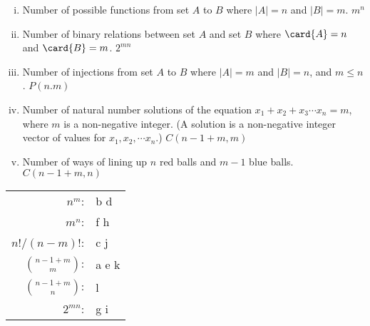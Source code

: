 \documentclass[quiz]{mcs}
\begin{document}
\begin{problem}
\begin{enumerate}[(i)]
\item Number of possible functions from set $A$ to $B$ where $|A|=n$ and
$|B|=m$. $m^n$

\item Number of binary relations between set $A$ and set $B$ where $\card{A}=n$ and
$\card{B}=m$. $2^{mn}$

\item Number of injections from set $A$ to $B$ where $|A|=m$ and $|B|=n$,
and $m \leq n$. $P(n.m)$

\item Number of natural number solutions of the equation $x_1 + x_2 + x_3
\cdots x_n = m$, where $m$ is a non-negative integer.  (A solution is
a non-negative integer vector of values for $x_1,x_2,\cdots x_n$.)
$C(n-1+m,m)$

\item Number of ways of lining up $n$ red balls and $m-1$ blue balls. $C(n-1+m,n)$

\end{enumerate}

\begin{solution}
\begin{center}
\begin{tabular}{rl}
$n^m$: & b d\\
$m^n$: & f h \\
$n!/(n-m)!$: & c j \\  %
$\binom{n-1+m}{m}$: & a e k \\  %
$\binom{n-1+m}{n}$: & l \\  %
$2^{mn}$: &  g i\\
\end{tabular}
\end{center}
\end{solution}

\end{problem}
\end{document}
